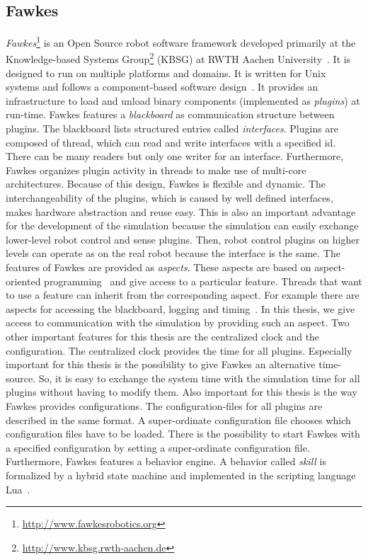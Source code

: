 \subsection{Fawkes}
\textit{Fawkes}\footnote{\url{http://www.fawkesrobotics.org}} is an Open Source robot software framework developed primarily at the Knowledge-based Systems Group\footnote{\url{http://www.kbsg.rwth-aachen.de}} (KBSG) at RWTH Aachen University~\cite{FawkesDesign}. It is designed to run on multiple platforms and domains. It is written for Unix systems and follows a component-based software design~\cite{component}. It provides an infrastructure to load and unload binary components (implemented as \textit{plugins}) at run-time. Fawkes features a \textit{blackboard} as communication structure between plugins. The blackboard lists structured entries called \textit{interfaces}. Plugins are composed of thread, which can read and write interfaces with a specified id. There can be many readers but only one writer for an interface. Furthermore, Fawkes organizes plugin activity in threads to make use of multi-core architectures. Because of this design, Fawkes is flexible and dynamic. The interchangeability of the plugins, which is caused by well defined interfaces, makes hardware abstraction and reuse easy. This is also an important advantage for the development of the simulation because the simulation can easily exchange lower-level robot control and sense plugins. Then, robot control plugins on higher levels can operate as on the real robot because the interface is the same. The features of Fawkes are provided as \textit{aspects}. These aspects are based on aspect-oriented programming~\cite{aspect_oriented} and give access to a particular feature. Threads that want to use a feature can inherit from the corresponding aspect. For example there are aspects for accessing the blackboard, logging and timing~\cite{tnthesis}. In this thesis, we give access to communication with the simulation by providing such an aspect. Two other important features for this thesis are the centralized clock and the configuration. The centralized clock provides the time for all plugins. Especially important for this thesis is the possibility to give Fawkes an alternative time-source. So, it is easy to exchange the system time with the simulation time for all plugins without having to modify them. Also important for this thesis is the way Fawkes provides configurations. The configuration-files for all plugins are described in the same format. A super-ordinate configuration file chooses which configuration files have to be loaded. There is the possibility to start Fawkes with a specified configuration by setting a super-ordinate configuration file. Furthermore, Fawkes features a behavior engine. A behavior called \textit{skill} is formalized by a hybrid state machine and implemented in the scripting language Lua~\cite{behavior_engine}.\\
